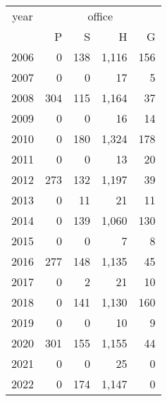 \footnotesize\begin{tabular}[t]{lrrrr}
\toprule
\multicolumn{1}{c}{year} & \multicolumn{4}{c}{office} \\
\cmidrule(l{3pt}r{3pt}){1-1} \cmidrule(l{3pt}r{3pt}){2-5}
  & P & S & H & G\\
\midrule
2006 & 0 & 138 & 1,116 & 156\\
2007 & 0 & 0 & 17 & 5\\
2008 & 304 & 115 & 1,164 & 37\\
2009 & 0 & 0 & 16 & 14\\
2010 & 0 & 180 & 1,324 & 178\\
2011 & 0 & 0 & 13 & 20\\
2012 & 273 & 132 & 1,197 & 39\\
2013 & 0 & 11 & 21 & 11\\
2014 & 0 & 139 & 1,060 & 130\\
2015 & 0 & 0 & 7 & 8\\
2016 & 277 & 148 & 1,135 & 45\\
2017 & 0 & 2 & 21 & 10\\
2018 & 0 & 141 & 1,130 & 160\\
2019 & 0 & 0 & 10 & 9\\
2020 & 301 & 155 & 1,155 & 44\\
2021 & 0 & 0 & 25 & 0\\
2022 & 0 & 174 & 1,147 & 0\\
\bottomrule
\end{tabular}
